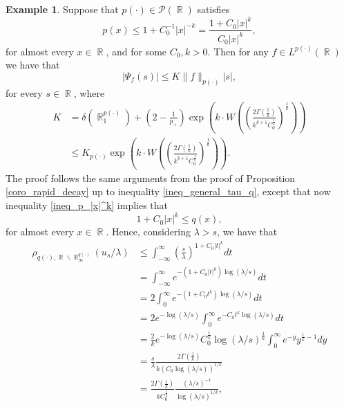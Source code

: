\documentclass[11pt,reqno]{amsart}
\theoremstyle{definition}
\newtheorem{example}[theorem]{Example}
\theoremstyle{definition}
\theoremstyle{definition}
\DeclareMathOperator{\R}{\mathbb{R}}
\newcommand{\p}{p(\cdot)}
\begin{document}
\begin{example}\label{exemp_|x|}
    Suppose that $p(\cdot)\in \mathcal{P}(\R)$ satisfies
    \begin{equation}\label{ineq_p_|x|^k}
       p(x)\leq 1+C_0^{-1}|x|^{-k}=\frac{1+C_0|x|^k}{C_0|x|^k},
    \end{equation}
    for almost every $x\in\R$, and for some $C_0, k> 0$. Then for any $f\in L^{p(\cdot)}(\R)$ we have that
    \begin{equation}\label{ineq_Psi_|x|^k}
        |\Psi_f(s)|\leq K\|f\|_{p(\cdot)}|s|,
    \end{equation}
    for every $s\in\R$, where \begin{align*}
        K&=\delta\left(\R^{\p}_1\right)+\left(2-\frac{1}{p_{+}}\right)\exp\left({k\cdot W\left(\left(\frac{2\Gamma(\frac{1}{k})}{k^{k+1}C_0^{\frac{1}{k}}}\right)^{\frac{1}{k}}\right)}\right)\\
        &\leq K_{\p}\exp\left({k\cdot W\left(\left(\frac{2\Gamma(\frac{1}{k})}{k^{k+1}C_0^{\frac{1}{k}}}\right)^{\frac{1}{k}}\right)}\right).
    \end{align*}
    The proof follows the same arguments from the proof of Proposition \ref{coro_rapid_decay} up to inequality \eqref{ineq_general_tau_q}, except that now inequality \eqref{ineq_p_|x|^k} implies that 
\begin{equation}\label{ineq_q_|x|^k}
      1+C_0|x|^k\leq q(x),
    \end{equation}
   for almost every $x\in\R$. Hence, considering $\lambda>s$, we have that
    \begin{align*}
        \rho_{q(\cdot),\R\backslash\R_{\infty}^{q(\cdot)}}(u_s/\lambda)&\leq \int_{-\infty}^{\infty}\left(\frac{s}{\lambda}\right)^{1+C_0|t|^k}dt\\
        &=\int_{-\infty}^{\infty}e^{-(1+C_0|t|^k)\log(\lambda/s)}dt\\
         &=2\int_{0}^{\infty}e^{-(1+C_0t^k)\log(\lambda/s)}dt\\
         &{=2e^{-\log(\lambda/s)}\int_0^{\infty}e^{-C_0t^k\log(\lambda/s)}dt}\\
         &=\frac{2}{k}e^{-\log(\lambda/s)}C_0^{\frac{1}{k}}\log(\lambda/s)^{\frac{1}{k}}\int_0^\infty e^{-y}y^{\frac{1}{k}-1}dy\\
         &=\frac{s}{\lambda}\frac{2\Gamma(\frac{1}{k})}{k(C_0\log(\lambda/s))^{1/k}}\\
         &=\frac{2\Gamma(\frac{1}{k})}{kC_0^{\frac{1}{k}}}\frac{(\lambda/s)^{-1}}{\log(\lambda/s)^{1/k}},
    \end{align*}

\end{example}
\end{document}
